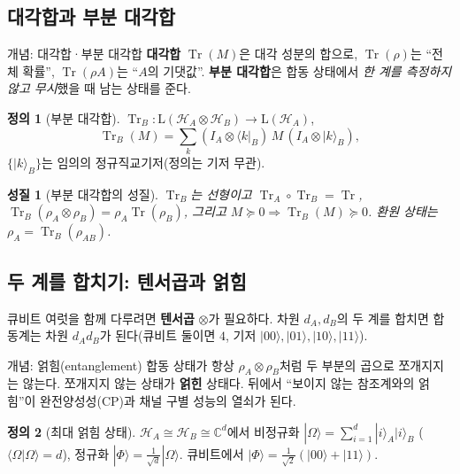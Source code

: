 \documentclass[11pt,a4paper]{article}
\newcommand{\Hcal}{\mathcal{H}}
\newcommand{\Tr}{\operatorname{Tr}}
\newcommand{\Lin}{\mathrm{L}}
\theoremstyle{definition}
\newtheorem{definition}{정의}[section]
\theoremstyle{plain}
\newtheorem{property}{성질}[section]
\theoremstyle{remark}
\begin{document}
\subsection{대각합과 부분 대각합}

\begin{conceptbox}{개념: 대각합·부분 대각합}
\textbf{대각합} $\Tr(M)$은 대각 성분의 합으로, $\Tr(\rho)$는 ``전체 확률'', $\Tr(\rho A)$는 ``$A$의 기댓값''. \textbf{부분 대각합}은 합동 상태에서 \emph{한 계를 측정하지 않고 무시}했을 때 남는 상태를 준다.
\end{conceptbox}

\begin{definition}[부분 대각합]
$\Tr_B:\Lin(\Hcal_A\otimes\Hcal_B)\to\Lin(\Hcal_A)$,
\[
\Tr_B(M)=\sum_k(I_A\otimes\langle k|_B)\,M\,(I_A\otimes|k\rangle_B),
\]
$\{|k\rangle_B\}$는 임의의 정규직교기저(정의는 기저 무관).
\end{definition}

\begin{property}[부분 대각합의 성질]\label{prop:ptrace}
$\Tr_B$는 선형이고 $\Tr_A\circ\Tr_B=\Tr$, $\Tr_B(\rho_A\otimes\rho_B)=\rho_A\Tr(\rho_B)$, 그리고 $M\succeq0\Rightarrow\Tr_B(M)\succeq0$. 환원 상태는 $\rho_A=\Tr_B(\rho_{AB})$.
\end{property}

\subsection{두 계를 합치기: 텐서곱과 얽힘}

큐비트 여럿을 함께 다루려면 \textbf{텐서곱} $\otimes$가 필요하다. 차원 $d_A,d_B$의 두 계를 합치면 합동계는 차원 $d_Ad_B$가 된다(큐비트 둘이면 $4$, 기저 $|00\rangle,|01\rangle,|10\rangle,|11\rangle$).

\begin{conceptbox}{개념: 얽힘(entanglement)}
합동 상태가 항상 $\rho_A\otimes\rho_B$처럼 두 부분의 곱으로 쪼개지지는 않는다. 쪼개지지 않는 상태가 \textbf{얽힌} 상태다. 뒤에서 ``보이지 않는 참조계와의 얽힘''이 완전양성성(CP)과 채널 구별 성능의 열쇠가 된다.
\end{conceptbox}

\begin{definition}[최대 얽힘 상태]
$\Hcal_A\cong\Hcal_B\cong\mathbb C^d$에서 비정규화 $|\Omega\rangle=\sum_{i=1}^d|i\rangle_A|i\rangle_B$ ($\langle\Omega|\Omega\rangle=d$), 정규화 $|\Phi\rangle=\tfrac1{\sqrt d}|\Omega\rangle$. 큐비트에서 $|\Phi\rangle=\tfrac1{\sqrt2}(|00\rangle+|11\rangle)$.
\end{definition}
\end{document}
